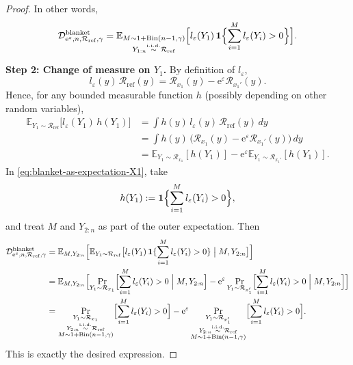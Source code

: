 \documentclass{article}
\theoremstyle{plain}
\theoremstyle{definition}
\begin{document}
\begin{proof}
In other words,
\begin{equation}
  \label{eq:blanket-as-expectation-X1}
  \mathcal{D}_{\mathrm{e}^\varepsilon,n,\mathcal{R}_\mathrm{ref},\gamma}^\text{blanket}
  =
  \mathbb E_{\substack{
    M\sim 1+\mathrm{Bin}(n-1,\gamma)\\
    Y_{1:n}\stackrel{\mathrm{i.i.d.}}{\sim}\mathcal R_{\mathrm{ref}}
  }}
  \Bigl[
    l_\varepsilon(Y_1)\,
    \mathbf 1\Bigl\{
      \sum_{i=1}^M l_\varepsilon(Y_i) > 0
    \Bigr\}
  \Bigr].
\end{equation}

\medskip\noindent
\textbf{Step 2: Change of measure on $Y_1$.}
By definition of $l_\varepsilon$,
\[
  l_\varepsilon(y)\,\mathcal R_{\mathrm{ref}}(y)
  = \mathcal R_{x_1}(y) - \mathrm e^\varepsilon \mathcal R_{x_1'}(y).
\]
Hence, for any bounded measurable function $h$ (possibly depending on
other random variables),
\begin{align*}
  \mathbb E_{Y_1\sim\mathcal R_{\mathrm{ref}}}
    \bigl[l_\varepsilon(Y_1)\,h(Y_1)\bigr]
  &= \int h(y)\,l_\varepsilon(y)\,\mathcal R_{\mathrm{ref}}(y)\,dy \\
  &= \int h(y)\,\bigl(\mathcal R_{x_1}(y)-\mathrm e^\varepsilon \mathcal R_{x_1'}(y)\bigr)\,dy \\
  &= \mathbb E_{Y_1\sim\mathcal R_{x_1}}[h(Y_1)]
     - \mathrm e^\varepsilon
       \mathbb E_{Y_1\sim\mathcal R_{x_1'}}[h(Y_1)].
\end{align*}
In \eqref{eq:blanket-as-expectation-X1}, take
\[
  h(Y_1)
  := \mathbf 1\Bigl\{
       \sum_{i=1}^M l_\varepsilon(Y_i) > 0
     \Bigr\},
\]
and treat $M$ and $Y_{2:n}$ as part of the outer expectation.
Then
\begin{align*}
  \mathcal{D}_{\mathrm{e}^\varepsilon,n,\mathcal{R}_\mathrm{ref},\gamma}^\text{blanket}
  &=
  \mathbb E_{M,Y_{2:n}}\Bigl[
    \mathbb E_{Y_1\sim\mathcal R_{\mathrm{ref}}}
    \bigl[
      l_\varepsilon(Y_1)\,
      \mathbf 1\{\sum_{i=1}^M l_\varepsilon(Y_i)>0\}
      \bigm| M,Y_{2:n}
    \bigr]
  \Bigr] \\
  &=
  \mathbb E_{M,Y_{2:n}}\Bigl[
    \Pr_{\substack{Y_1\sim\mathcal R_{x_1}}}
      \Bigl[
        \sum_{i=1}^M l_\varepsilon(Y_i)>0
      \Bigm| M,Y_{2:n}
      \Bigr]
    - \mathrm e^\varepsilon
      \Pr_{\substack{Y_1\sim\mathcal R_{x_1'}}}
      \Bigl[
        \sum_{i=1}^M l_\varepsilon(Y_i)>0
      \Bigm| M,Y_{2:n}
      \Bigr]
  \Bigr] \\
  &=
  \Pr_{\substack{
    Y_1\sim\mathcal R_{x_1}\\
    Y_{2:n}\stackrel{\mathrm{i.i.d.}}{\sim}\mathcal R_{\mathrm{ref}}\\
    M\sim 1+\mathrm{Bin}(n-1,\gamma)
  }}
  \Bigl[
    \sum_{i=1}^M l_\varepsilon(Y_i)>0
  \Bigr]
  - \mathrm e^\varepsilon
  \Pr_{\substack{
    Y_1\sim\mathcal R_{x_1'}\\
    Y_{2:n}\stackrel{\mathrm{i.i.d.}}{\sim}\mathcal R_{\mathrm{ref}}\\
    M\sim 1+\mathrm{Bin}(n-1,\gamma)
  }}
  \Bigl[
    \sum_{i=1}^M l_\varepsilon(Y_i)>0
  \Bigr].
\end{align*}
This is exactly the desired expression.
\end{proof}
\end{document}
